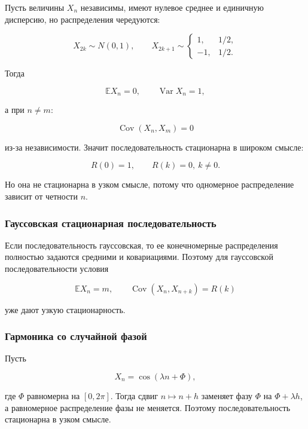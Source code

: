 \documentclass[
  11pt,
  a4paper,
]{article}
\begin{document}
Пусть величины \(X_n\) независимы, имеют нулевое среднее и единичную
дисперсию, но распределения чередуются:

\[
X_{2k}\sim N(0,1),
\qquad
X_{2k+1}\sim
\begin{cases}
1, & 1/2,\\
-1, & 1/2.
\end{cases}
\]

Тогда

\[
\mathbb E X_n=0,
\qquad
\operatorname{Var}X_n=1,
\]

а при \(n\ne m\):

\[
\operatorname{Cov}(X_n,X_m)=0
\]

из-за независимости. Значит последовательность стационарна в широком
смысле:

\[
R(0)=1,\qquad R(k)=0,\ k\ne0.
\]

Но она не стационарна в узком смысле, потому что одномерное
распределение зависит от четности \(n\).

\subsubsection{Гауссовская стационарная
последовательность}\label{ux433ux430ux443ux441ux441ux43eux432ux441ux43aux430ux44f-ux441ux442ux430ux446ux438ux43eux43dux430ux440ux43dux430ux44f-ux43fux43eux441ux43bux435ux434ux43eux432ux430ux442ux435ux43bux44cux43dux43eux441ux442ux44c}

Если последовательность гауссовская, то ее конечномерные распределения
полностью задаются средними и ковариациями. Поэтому для гауссовской
последовательности условия

\[
\mathbb E X_n=m,
\qquad
\operatorname{Cov}(X_n,X_{n+k})=R(k)
\]

уже дают узкую стационарность.

\subsubsection{Гармоника со случайной
фазой}\label{ux433ux430ux440ux43cux43eux43dux438ux43aux430-ux441ux43e-ux441ux43bux443ux447ux430ux439ux43dux43eux439-ux444ux430ux437ux43eux439}

Пусть

\[
X_n=\cos(\lambda n+\Phi),
\]

где \(\Phi\) равномерна на \([0,2\pi]\). Тогда сдвиг \(n\mapsto n+h\)
заменяет фазу \(\Phi\) на \(\Phi+\lambda h\), а равномерное
распределение фазы не меняется. Поэтому последовательность стационарна в
узком смысле.
\end{document}
